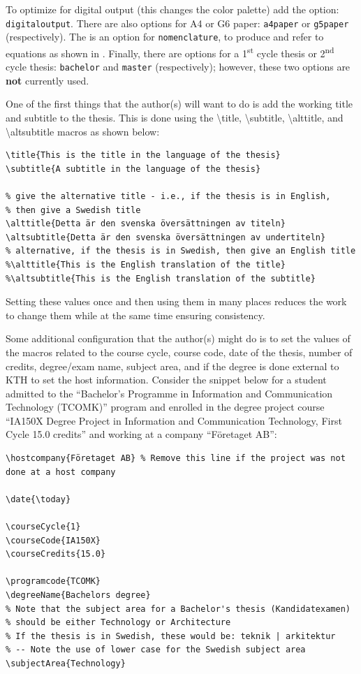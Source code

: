 \documentclass[examplethesis.tex]{subfiles}
\begin{document}
To optimize for digital output (this changes the color palette) add the option: \texttt{digitaloutput}. There are also options for A4 or G6 paper: \texttt{a4paper} or \texttt{g5paper} (respectively). The is an option for \texttt{nomenclature}, to produce and refer to equations
\ifnomenclature
as shown in 
\fi
.  Finally, there are options for a 1\textsuperscript{st} cycle thesis or 2\textsuperscript{nd} cycle thesis: \texttt{bachelor} and \texttt{master} (respectively); however, these two options are \textbf{not} currently used.

One of the first things that the author(s) will want to do is add the working title and subtitle to the thesis. This is done using the \textbackslash title, \textbackslash subtitle, \textbackslash alttitle, and \textbackslash altsubtitle macros as shown below:
\begin{lstlisting}[style=latexExampleForAuthors]
\title{This is the title in the language of the thesis}
\subtitle{A subtitle in the language of the thesis}

% give the alternative title - i.e., if the thesis is in English,
% then give a Swedish title
\alttitle{Detta är den svenska översättningen av titeln}
\altsubtitle{Detta är den svenska översättningen av undertiteln}
% alternative, if the thesis is in Swedish, then give an English title
%\alttitle{This is the English translation of the title}
%\altsubtitle{This is the English translation of the subtitle}   
\end{lstlisting}

Setting these values once and then using them in many places reduces the work to change them while at the same time ensuring consistency. 

Some additional configuration that the author(s) might do is to set the values of the macros related to the course cycle, course code, date of the thesis, number of credits, degree/exam name, subject area, and if the degree is done external to KTH to set the host information. Consider the snippet below for a student admitted to the ``Bachelor's Programme in Information and Communication Technology (TCOMK)'' program and enrolled in the degree project course ``IA150X Degree Project in Information and Communication Technology, First Cycle 15.0 credits'' and working at a company ``Företaget AB'':
\begin{lstlisting}[style=latexExampleForAuthors]
\hostcompany{Företaget AB} % Remove this line if the project was not done at a host company

\date{\today}

\courseCycle{1}
\courseCode{IA150X}
\courseCredits{15.0}

\programcode{TCOMK}
\degreeName{Bachelors degree}
% Note that the subject area for a Bachelor's thesis (Kandidatexamen)
% should be either Technology or Architecture
% If the thesis is in Swedish, these would be: teknik | arkitektur
% -- Note the use of lower case for the Swedish subject area
\subjectArea{Technology}
\end{lstlisting}
\end{document}

